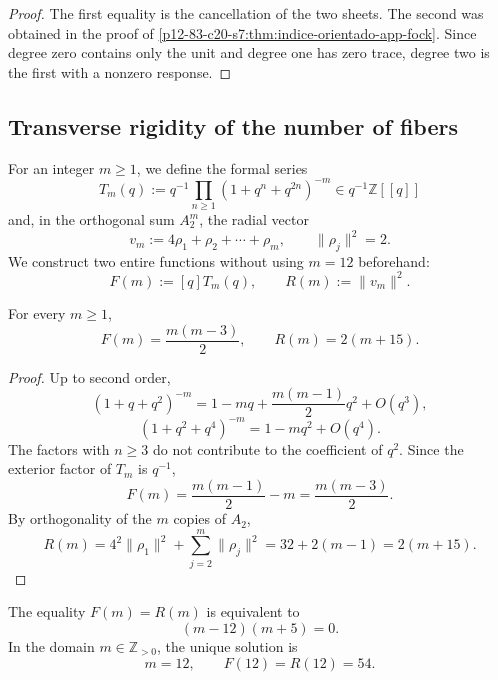\begin{proof}
The first equality is the cancellation of the two sheets. The second was
obtained in the proof of \cref{p12-83-c20-s7:thm:indice-orientado-app-fock}. Since degree
zero contains only the unit and degree one has zero trace, degree two is
the first with a nonzero response.
\end{proof}

\subsection{Transverse rigidity of the number of fibers}

For an integer \(m\ge1\), we define the formal series
\begin{equation}
 T_m(q):=
 q^{-1}\prod_{n\ge1}(1+q^n+q^{2n})^{-m}
 \in q^{-1}\mathbb Z[[q]]
 \label{p12-83-c20-s7:eq:familia-fock-m-fibras-u030}
\end{equation}
and, in the orthogonal sum \(A_2^m\), the radial vector
\begin{equation}
 v_m:=4\rho_1+\rho_2+\cdots+\rho_m,
 \qquad
 \|\rho_j\|^2=2.
 \label{p12-83-c20-s7:eq:familia-radial-m-fibras-u030}
\end{equation}
We construct two entire functions without using \(m=12\) beforehand:
\[
 F(m):=[q]T_m(q),
 \qquad
 R(m):=\|v_m\|^2.
\]

\begin{proposition}
\label{p12-83-c20-s7:prop:dos-funciones-rigidez-doce-u030}
For every \(m\ge1\),
\begin{equation}
 F(m)=\frac{m(m-3)}2,
 \qquad
 R(m)=2(m+15).
 \label{p12-83-c20-s7:eq:funciones-rigidez-doce-u030}
\end{equation}
\end{proposition}

\begin{proof}
Up to second order,
\[
 (1+q+q^2)^{-m}
 =1-mq+\frac{m(m-1)}2q^2+O(q^3),
\]
\[
 (1+q^2+q^4)^{-m}=1-mq^2+O(q^4).
\]
The factors with \(n\ge3\) do not contribute to the coefficient of \(q^2\).
Since the exterior factor of \(T_m\) is \(q^{-1}\),
\[
 F(m)=\frac{m(m-1)}2-m=\frac{m(m-3)}2.
\]
By orthogonality of the \(m\) copies of \(A_2\),
\[
 R(m)=4^2\|\rho_1\|^2+
 \sum_{j=2}^{m}\|\rho_j\|^2
 =32+2(m-1)=2(m+15).
\]
\end{proof}

\begin{theorem}
\label{p12-83-c20-s7:thm:rigidez-transversal-doce-u030}
The equality \(F(m)=R(m)\) is equivalent to
\begin{equation}
 (m-12)(m+5)=0.
 \label{p12-83-c20-s7:eq:ecuacion-rigidez-doce-u030}
\end{equation}
In the domain \(m\in\mathbb Z_{>0}\), the unique solution is
\[
 \boxed{m=12,\qquad F(12)=R(12)=54.}
\]
\end{theorem}

